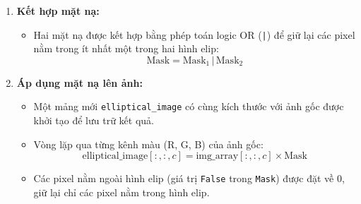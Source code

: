 \begin{enumerate}
	\item \textbf{Kết hợp mặt nạ:}
	      \begin{itemize}
		      \item Hai mặt nạ được kết hợp bằng phép toán logic OR (\texttt{|}) để giữ lại các pixel nằm trong ít nhất một trong hai hình elip:
		            \[
			            \text{Mask} = \text{Mask}_1 \, | \, \text{Mask}_2
		            \]
	      \end{itemize}

	\item \textbf{Áp dụng mặt nạ lên ảnh:}
	      \begin{itemize}
		      \item Một mảng mới \texttt{elliptical\_image} có cùng kích thước với ảnh gốc được khởi tạo để lưu trữ kết quả.
		      \item Vòng lặp qua từng kênh màu (R, G, B) của ảnh gốc:
		            \[
			            \text{elliptical\_image}[:, :, c] = \text{img\_array}[:, :, c] \times \text{Mask}
		            \]
		      \item Các pixel nằm ngoài hình elip (giá trị \texttt{False} trong \texttt{Mask}) được đặt về 0, giữ lại chỉ các pixel nằm trong hình elip.
	      \end{itemize}

\end{enumerate}
